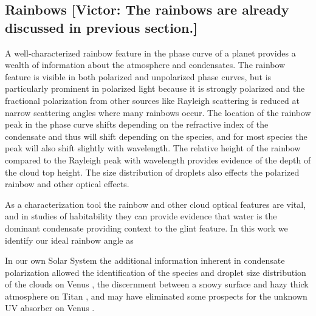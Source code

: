 \documentclass[
    usenatbib,
]{mnras}
\begin{document}
\subsection{Rainbows {\color{Green} [Victor: The rainbows are already discussed in previous section.]}}

A well-characterized rainbow feature in the phase curve of a planet provides a wealth of information about the atmosphere and condensates. The rainbow feature is visible in both polarized and unpolarized phase curves, but is particularly prominent in polarized light because it is strongly polarized and the fractional polarization from other sources like Rayleigh scattering is reduced at narrow scattering angles where many rainbows occur. The location of the rainbow peak in the phase curve shifts depending on the refractive index of the condensate and thus will shift depending on the species, and for most species the peak will also shift slightly with wavelength. The relative height of the rainbow compared to the Rayleigh peak with wavelength provides evidence of the depth of the cloud top height. The size distribution of droplets also effects the polarized rainbow and other optical effects.
% 

As a characterization tool the rainbow and other cloud optical features are vital, and in studies of habitability they can provide evidence that water is the dominant condensate providing context to the glint feature.  In this work we identify our ideal rainbow angle as %

In our own Solar System the additional information inherent in condensate polarization allowed the identification of the species and droplet size distribution of the clouds on Venus \citep{Hansen1974}, the discernment between a snowy surface and hazy thick atmosphere on Titan \citep{Zellner1973}, and may have eliminated some prospects for the unknown UV absorber on Venus \citep{Petrova2018}. 



\end{document}
